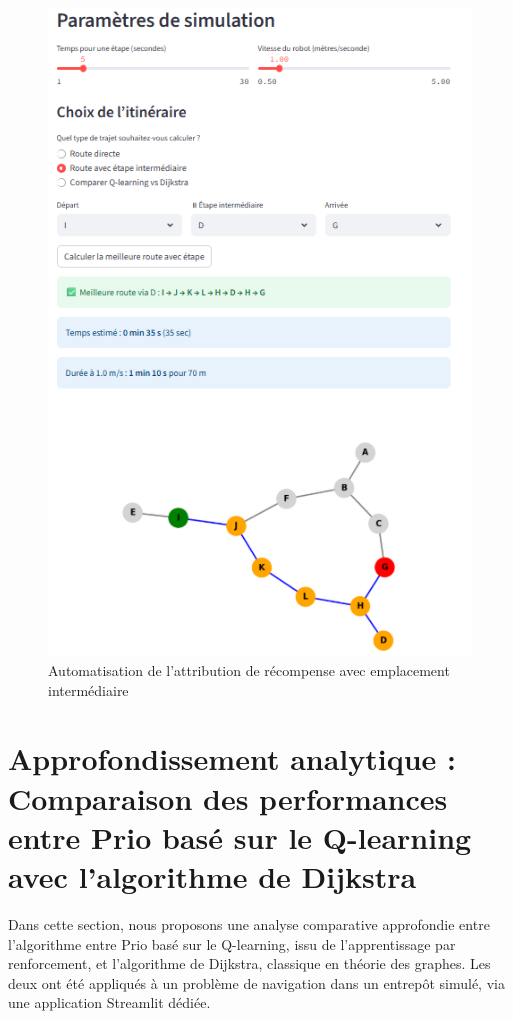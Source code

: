 \documentclass{article}
\begin{document}
\begin{figure}[htbp]
\begin{minipage}[b]{0.45\textwidth}
    \includegraphics[width=\textwidth]{routeIntermediaire.png}
    \caption{Automatisation de l'attribution de récompense avec emplacement intermédiaire}
    \label{fig:Automatisation de l'attribution de récompense avec emplacement intermédiaire}
  \end{minipage}
\end{figure}


\section{Approfondissement analytique : Comparaison des performances entre Prio basé sur le Q-learning avec l'algorithme de Dijkstra}
Dans cette section, nous proposons une analyse comparative approfondie entre l'algorithme  entre Prio basé sur le Q-learning, issu de l'apprentissage par renforcement, et l'algorithme de Dijkstra, classique en théorie des graphes. Les deux ont été appliqués à un problème de navigation dans un entrepôt simulé, via une application Streamlit dédiée.
\end{document}
